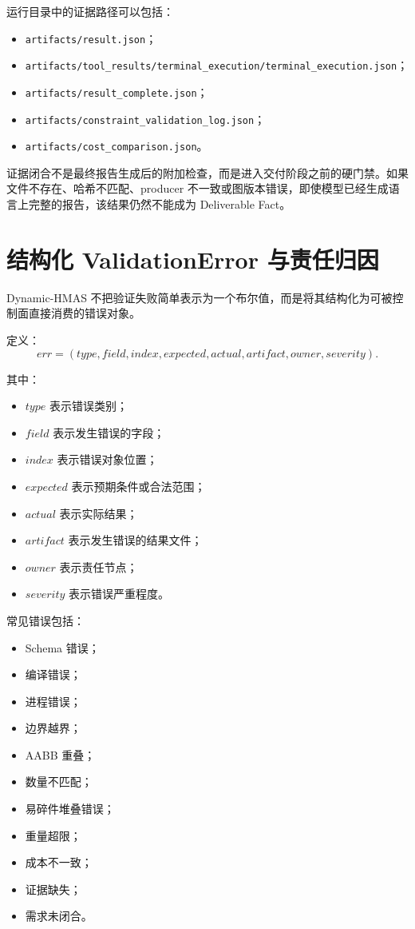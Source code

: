 \documentclass[UTF8,a4paper,12pt,oneside]{ctexbook}
\begin{document}
运行目录中的证据路径可以包括：

\begin{itemize}
    \item \texttt{artifacts/result.json}；
    \item \texttt{artifacts/tool\_results/terminal\_execution/terminal\_execution.json}；
    \item \texttt{artifacts/result\_complete.json}；
    \item \texttt{artifacts/constraint\_validation\_log.json}；
    \item \texttt{artifacts/cost\_comparison.json}。
\end{itemize}

证据闭合不是最终报告生成后的附加检查，而是进入交付阶段之前的硬门禁。如果文件不存在、哈希不匹配、producer 不一致或图版本错误，即使模型已经生成语言上完整的报告，该结果仍然不能成为 Deliverable Fact。


\section{结构化 ValidationError 与责任归因}

Dynamic-HMAS 不把验证失败简单表示为一个布尔值，而是将其结构化为可被控制面直接消费的错误对象。

定义：
\[
err=
(
type,
field,
index,
expected,
actual,
artifact,
owner,
severity
).
\]

其中：

\begin{itemize}
    \item $type$ 表示错误类别；
    \item $field$ 表示发生错误的字段；
    \item $index$ 表示错误对象位置；
    \item $expected$ 表示预期条件或合法范围；
    \item $actual$ 表示实际结果；
    \item $artifact$ 表示发生错误的结果文件；
    \item $owner$ 表示责任节点；
    \item $severity$ 表示错误严重程度。
\end{itemize}

常见错误包括：

\begin{itemize}
    \item Schema 错误；
    \item 编译错误；
    \item 进程错误；
    \item 边界越界；
    \item AABB 重叠；
    \item 数量不匹配；
    \item 易碎件堆叠错误；
    \item 重量超限；
    \item 成本不一致；
    \item 证据缺失；
    \item 需求未闭合。
\end{itemize}
\end{document}
